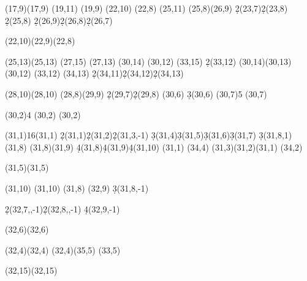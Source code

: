 \documentclass{article}
\begin{document}
\begin{sseqdata}
\class["P^2h_1"](17,9)\etasqclass(17,9)
\divfourclass["P^2h_2" {below=0em}](19,11)
\nuclass(19,9)
\divfourclass["Pd_0" left](22,10)
\etacubclass(22,8)
\diveightclass["Pe_0" below](25,11)
\etaclass(25,8)\divfourclass["j" below](26,9)
\d2(23,7)\d2(23,8) %
\d2(25,8) %
\d2(26,9)\d2(26,8)\d2(26,7) %

\nustruct(22,10)\nustruct(22,9)\nustruct(22,8)


\class["P^3h_1"](25,13)\etasqclass(25,13)
\divfourclass["P^3h_2" {below=0em}](27,15)
\nuclass(27,13)
\divfourclass["P^2d_0" {left=0.2em}](30,14)
\etacubclass(30,12)
\diveightclass["P^2e_0" {below=0em}](33,15)
\d2(33,12) %
\nustruct(30,14)\nustruct(30,13)\nustruct(30,12)
\etaclass(33,12)
\divfourclass["Pj" {right}](34,13)
\d2(34,11)\d2(34,12)\d2(34,13) %



\class(28,10)\divfourclass["{Pg=d_0^2}" {below left=-0.5em}](28,10)
\etaclass(28,8)\divfourclass["k" below](29,9)
\d2(29,7)\d2(29,8) %
\class["r" below](30,6) \d3(30,6) %
\tower(30,7){5}
\classoptions["s" below](30,7)

\tower(30,2){4}
\classoptions["h_4^2" below](30,2)
\etaclass(30,2)

\tower(31,1){16}\classoptions["h_5" below](31,1)
\d2(31,1)\d2(31,2)\d2(31,3,-1) %
\d3(31,4)\d3(31,5)\d3(31,6)\d3(31,7) \d3(31,8,1) %
\replaceclass[offset={(0,0)}](31,8) %
\structline(31,8)(31,9)
\d4(31,8)\d4(31,9)\d4(31,10) %
\etacubclass(31,1)
\divfourclass[](34,4)
\nustruct(31,3)\nustruct(31,2)\nustruct(31,1)
\nuclass(34,2)

\class["n" above](31,5)\nuclass(31,5)

\class(31,10)
\divfourclass["d_0e_0" {below right=0em,xshift=-5pt}](31,10)
\etaclass(31,8)
\divfourclass["l" {right=0em}](32,9)
\d3(31,8,-1)     %

\d2(32,7,,-1)\d2(32,8,,-1) %
\d4(32,9,-1) %

\class["q"](32,6)\etaclass(32,6)

\class["d_1"](32,4)\etaclass(32,4)
\nuclass(32,4)\nuclass(35,5)
(33,5)

\class["P^3c_0"{xshift=4pt,yshift=2pt}](32,15)\etaclass(32,15)


\end{sseqdata}
\end{document}
